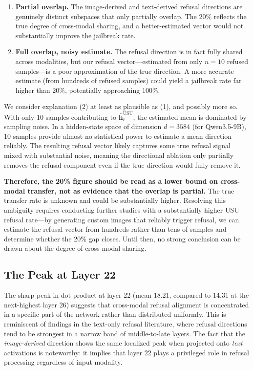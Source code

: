 \documentclass[11pt]{article}
\begin{document}
\begin{enumerate}[nosep]
    \item \textbf{Partial overlap.} The image-derived and text-derived refusal directions are genuinely distinct subspaces that only partially overlap. The 20\% reflects the true degree of cross-modal sharing, and a better-estimated vector would not substantially improve the jailbreak rate.
    \item \textbf{Full overlap, noisy estimate.} The refusal direction is in fact fully shared across modalities, but our refusal vector---estimated from only $n = 10$ refused samples---is a poor approximation of the true direction. A more accurate estimate (from hundreds of refused samples) could yield a jailbreak rate far higher than 20\%, potentially approaching 100\%.
\end{enumerate}

\noindent We consider explanation (2) at least as plausible as (1), and possibly more so. With only 10 samples contributing to $\bar{\mathbf{h}}_\ell^{\text{USU}}$, the estimated mean is dominated by sampling noise. In a hidden-state space of dimension $d = 3584$ (for Qwen3.5-9B), 10 samples provide almost no statistical power to estimate a mean direction reliably. The resulting refusal vector likely captures some true refusal signal mixed with substantial noise, meaning the directional ablation only partially removes the refusal component even if the true direction would fully remove it.

\textbf{Therefore, the 20\% figure should be read as a lower bound on cross-modal transfer, not as evidence that the overlap is partial.} The true transfer rate is unknown and could be substantially higher. Resolving this ambiguity requires conducting further studies with a substantially higher USU refusal rate---by generating custom images that reliably trigger refusal, we can estimate the refusal vector from hundreds rather than tens of samples and determine whether the 20\% gap closes. Until then, no strong conclusion can be drawn about the degree of cross-modal sharing.

\subsection{The Peak at Layer 22}

The sharp peak in dot product at layer 22 (mean 18.21, compared to 14.31 at the next-highest layer 26) suggests that cross-modal refusal alignment is concentrated in a specific part of the network rather than distributed uniformly. This is reminiscent of findings in the text-only refusal literature, where refusal directions tend to be strongest in a narrow band of middle-to-late layers. The fact that the \textit{image-derived} direction shows the same localized peak when projected onto \textit{text} activations is noteworthy: it implies that layer 22 plays a privileged role in refusal processing regardless of input modality.
\end{document}
